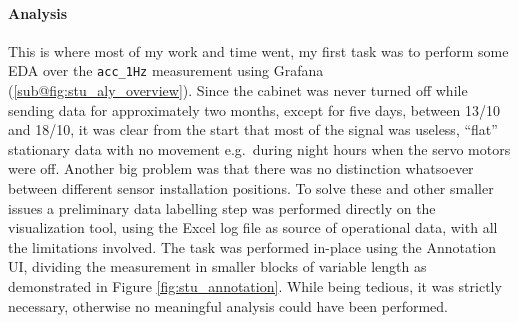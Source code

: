 \paragraph{Analysis}
This is where most of my work and time went, my first task was to perform some \acl{EDA} over the \texttt{acc\_1Hz} measurement using Grafana (\ref{sub@fig:stu_aly_overview}).
Since the cabinet was never turned off while sending data for approximately two months, except for five days, between 13/10 and 18/10, it was clear from the start that most of 
the signal was useless, ``flat'' stationary data with no movement e.g.\ during night hours when the servo motors were off. 
Another big problem was that there was no distinction whatsoever between different sensor installation positions.
To solve these and other smaller issues a preliminary data labelling step was performed directly on the visualization tool, using the Excel log file as source of 
operational data, with all the limitations involved. The task was performed in-place using the Annotation UI, dividing the measurement in smaller blocks of variable length 
as demonstrated in Figure \ref{fig:stu_annotation}. While being tedious, it was strictly necessary, otherwise no meaningful analysis could have been performed.


